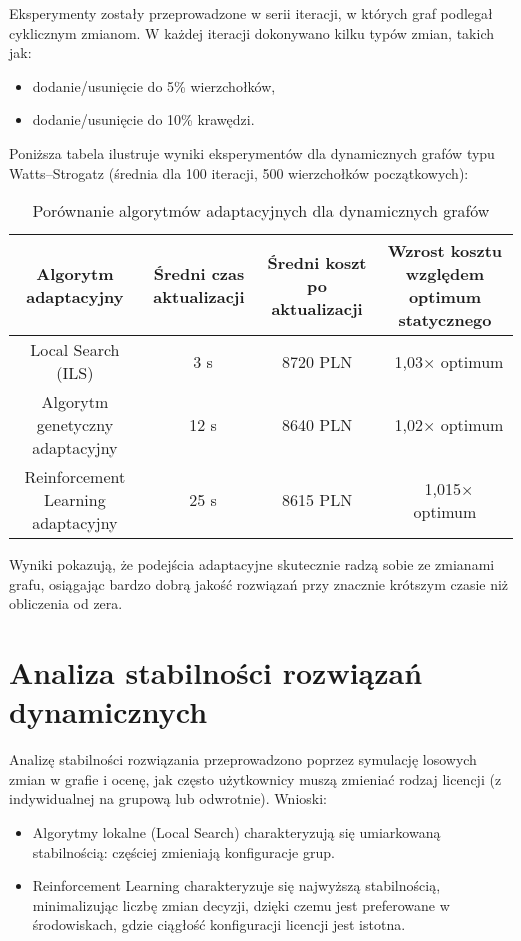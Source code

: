 Eksperymenty zostały przeprowadzone w serii iteracji, w których graf podlegał cyklicznym zmianom. W każdej iteracji dokonywano kilku typów zmian, takich jak:

\begin{itemize}
    \item dodanie/usunięcie do 5\% wierzchołków,
    \item dodanie/usunięcie do 10\% krawędzi.
\end{itemize}

Poniższa tabela ilustruje wyniki eksperymentów dla dynamicznych grafów typu Watts–Strogatz (średnia dla 100 iteracji, 500 wierzchołków początkowych):

\begin{table}[h]
\centering
\begin{tabular}{|c|c|c|c|}
\hline
\textbf{Algorytm adaptacyjny} & \textbf{Średni czas aktualizacji} & \textbf{Średni koszt po aktualizacji} & \textbf{Wzrost kosztu względem optimum statycznego} \\
\hline
Local Search (ILS)   & ~3 s  & 8720 PLN  & ~1,03× optimum  \\
Algorytm genetyczny adaptacyjny & ~12 s  & 8640 PLN  & ~1,02× optimum  \\
Reinforcement Learning adaptacyjny & ~25 s  & 8615 PLN  & ~1,015× optimum  \\
\hline
\end{tabular}
\caption{Porównanie algorytmów adaptacyjnych dla dynamicznych grafów}
\label{tab:dynamic_results}
\end{table}

Wyniki pokazują, że podejścia adaptacyjne skutecznie radzą sobie ze zmianami grafu, osiągając bardzo dobrą jakość rozwiązań przy znacznie krótszym czasie niż obliczenia od zera.

\section{Analiza stabilności rozwiązań dynamicznych}

Analizę stabilności rozwiązania przeprowadzono poprzez symulację losowych zmian w grafie i ocenę, jak często użytkownicy muszą zmieniać rodzaj licencji (z indywidualnej na grupową lub odwrotnie). Wnioski:

\begin{itemize}
    \item Algorytmy lokalne (Local Search) charakteryzują się umiarkowaną stabilnością: częściej zmieniają konfiguracje grup.
    \item Reinforcement Learning charakteryzuje się najwyższą stabilnością, minimalizując liczbę zmian decyzji, dzięki czemu jest preferowane w środowiskach, gdzie ciągłość konfiguracji licencji jest istotna.
\end{itemize}

